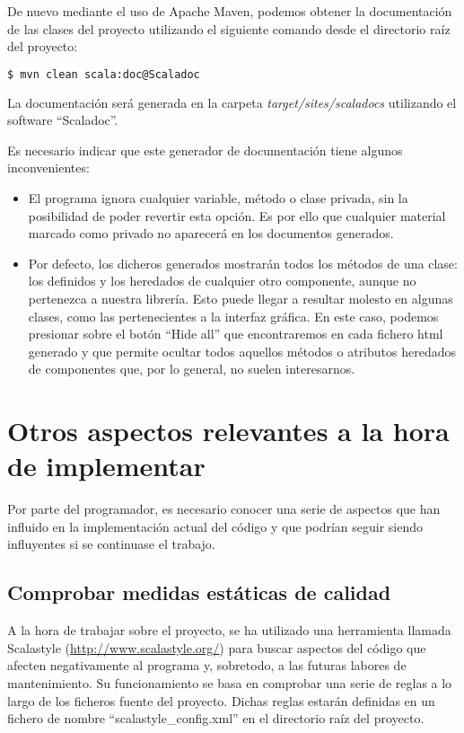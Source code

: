 De nuevo mediante el uso de Apache Maven, podemos obtener la documentación de las clases del proyecto utilizando el siguiente comando desde el directorio raíz del proyecto:

\begin{lstlisting}[language=bash]
$ mvn clean scala:doc@Scaladoc
\end{lstlisting}

La documentación será generada en la carpeta \textit{target/sites/scaladocs} utilizando el software ``Scaladoc''.

Es necesario indicar que este generador de documentación tiene algunos inconvenientes:
\begin{itemize}
\item El programa ignora cualquier variable, método o clase privada, sin la posibilidad de poder revertir esta opción. Es por ello que cualquier material marcado como privado no aparecerá en los documentos generados.
\item Por defecto, los dicheros generados mostrarán todos los métodos de una clase: los definidos y los heredados de cualquier otro componente, aunque no pertenezca a nuestra librería. Esto puede llegar a resultar molesto en algunas clases, como las pertenecientes a la interfaz gráfica. En este caso, podemos presionar sobre el botón ``Hide all'' que encontraremos en cada fichero html generado y que permite ocultar todos aquellos métodos o atributos heredados de componentes que, por lo general, no suelen interesarnos.
\end{itemize}
 


\section{Otros aspectos relevantes a la hora de implementar}

Por parte del programador, es necesario conocer una serie de aspectos que han influido en la implementación actual del código y que podrían seguir siendo influyentes si se continuase el trabajo.

\subsection{Comprobar medidas estáticas de calidad}

A la hora de trabajar sobre el proyecto, se ha utilizado una herramienta llamada Scalastyle (\url{http://www.scalastyle.org/}) para buscar aspectos del código que afecten negativamente al programa y, sobretodo, a las futuras labores de mantenimiento. Su funcionamiento se basa en comprobar una serie de reglas a lo largo de los ficheros fuente del proyecto. Dichas reglas estarán definidas en un fichero de nombre ``scalastyle\_config.xml'' en el directorio raíz del proyecto.

